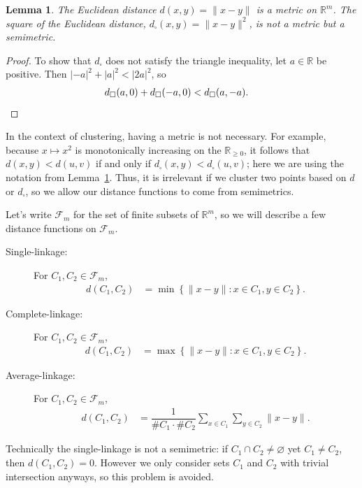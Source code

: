 \documentclass[a4paper, 12pt]{article}
\numberwithin{equation}{section}
\numberwithin{figure}{section}
\newtheorem{lem}[thm]{Lemma}
\theoremstyle{definition}
\renewcommand{\geq}{\geqslant}
\newcommand{\R}{\mathbb{R}}
\begin{document}
\begin{lem}\label{lem:semimetrics}
	The Euclidean distance $d(x,y) = \|x-y\|$ is a metric on $\R^m$. The square
	of the Euclidean distance, $d_{\square}(x,y)=\|x-y\|^2$, is not a metric but
	a semimetric.
\end{lem}

\begin{proof}
	To show that $d_{\square}$ does not satisfy the triangle inequality, let
	$a\in\R$ be positive. Then $|-a|^2 + |a|^2 < |2a|^2$, so
	\begin{align*}
		d_{\square}(a,0) + d_{\square}(-a,0) &< d_{\square}(a,-a). \qedhere
	\end{align*}
\end{proof}

In the context of clustering, having a metric is not necessary. For example,
because $x\mapsto x^2$ is monotonically increasing on the $\R_{\geq 0}$, it
follows that $d(x,y) < d(u,v)$ if and only if $d_{\square}(x,y) <
d_{\square}(u,v)$; here we are using the notation from Lemma~\ref{lem:semimetrics}.
Thus, it is irrelevant if we cluster two points based on $d$ or $d_{\square}$,
so we allow our distance functions to come from semimetrics. 

Let's write $\mathscr{F}_m$ for the set of finite subsets of $\R^m$, so we will
describe a few distance functions on $\mathscr{F}_m$.
\begin{description}
	\item[Single-linkage:] For $C_1,C_2\in\mathscr{F}_m$, 
	\begin{align*}
		d(C_1, C_2) &= \min\left\{ \| x - y\| : x\in C_1, y\in C_2 \right\}. 
	\end{align*}
	\item[Complete-linkage:] For $C_1,C_2\in\mathscr{F}_m$, 
	\begin{align*}
		d(C_1, C_2) &= \max\left\{ \| x - y\| : x\in C_1, y\in C_2 \right\}. 
	\end{align*}
	\item[Average-linkage:] For $C_1,C_2\in\mathscr{F}_m$, 
	\begin{align*}
		d(C_1, C_2) &= \dfrac{1}{\# C_1 \cdot \# C_2} \sum_{x \in C_1} \sum_{y\in C_2} \|x - y\|. 
	\end{align*}
\end{description}
Technically the single-linkage is not a semimetric: if $C_1\cap C_2\neq
\varnothing$ yet $C_1\neq C_2$, then $d(C_1, C_2)=0$. However we only consider
sets $C_1$ and $C_2$ with trivial intersection anyways, so this problem is
avoided. 
\end{document}
